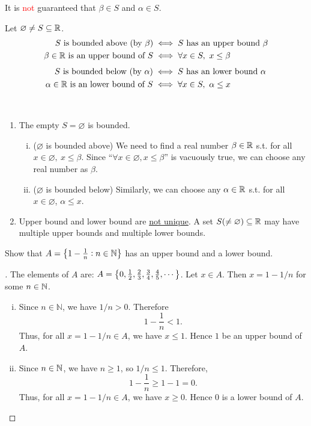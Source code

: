 \documentclass[11pt,openany]{article}
\begin{document}
\begin{remark*}[\textcolor{red}{\bf Caution!}]
	It is \textcolor{red}{not} guaranteed that $\beta\in S$ and $\alpha\in S$.
\end{remark*}
\vfill
\begin{remark*}
	Let $\varnothing\neq S\subseteq\mathbb{R}$.
	\begin{align*}
		S\ \text{is bounded above}\ (\text{by}\ \beta) &\iff S\ \text{has an upper bound}\ \beta\\
		\beta\in\R\ \text{is an upper bound of}\ S &\iff \forall x\in S,\ x\leq \beta
	\end{align*}
	\begin{align*}
		S\ \text{is bounded below}\ (\text{by}\ \alpha) &\iff S\ \text{has an lower bound}\ \alpha\\
		\alpha\in\R\ \text{is an lower bound of}\ S &\iff \forall x\in S,\ \alpha\leq x
	\end{align*}
\end{remark*}
\vfill
\begin{remark*}
\ \begin{enumerate}
	\item The empty $S=\varnothing$ is bounded.
	\begin{enumerate}[(i)]
		\item ($\varnothing$ is bounded above) We need to find a real number $\beta\in\mathbb{R}$ s.t. for all $x\in\varnothing,\ x\leq\beta$. Since ``$\forall x\in\varnothing, x\leq\beta$'' is vacuously true, we can choose any real number as $\beta$.
		\item ($\varnothing$ is bounded below) Similarly, we can choose any $\alpha\in\mathbb{R}$ s.t. for all $x\in\varnothing$, $\alpha\leq x$.
	\end{enumerate}
	\item Upper bound and lower bound are \underline{not unique}. A set \( S(\neq\varnothing)\subseteq\mathbb{R} \) may have multiple upper bounds and multiple lower bounds.
\end{enumerate}
\end{remark*}
\newpage
\begin{exercise*}
Show that $A=\set{1-\frac{1}{n}:n\in\mathbb{N}}$ has an upper bound and a lower bound.
\begin{proof}[\sol]
	The elements of $A$ are: $A=\set{0, \frac{1}{2}, \frac{2}{3}, \frac{3}{4}, \frac{4}{5}, \cdots}$. Let $x\in A$. Then $x=1-1/n$ for some $n\in\mathbb{N}$. \begin{enumerate}[(i)]
		\item Since $n\in\mathbb{N}$, we have $1/n>0$. Therefore \[
		1-\frac{1}{n}<1.
		\] Thus, for all $x=1-1/n\in A$, we have $x\leq 1$. Hence $1$ be an upper bound of $A$.
		\item Since $n\in\mathbb{N}$, we have $n\geq 1$, so $1/n\leq 1$. Therefore, \[
		1-\frac{1}{n}\geq 1-1=0.
		\] Thus, for all $x=1-1/n\in A$, we have $x\geq 0$. Hence $0$ is a lower bound of $A$.
	\end{enumerate}
	\begin{center}
	
	\end{center}
\end{proof}
\end{exercise*}
\end{document}
